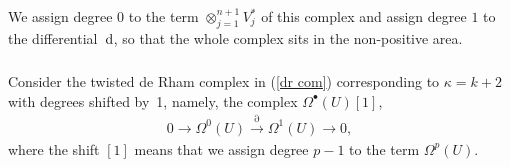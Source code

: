 We assign degree $0$ to the term $\otimes_{j=1}^{n+1}V_j^*$ of this complex and assign degree $1$ to the differential~${\rm d}$, so that the whole complex sits in the non-positive area.

\subsubsection{} Consider the twisted de Rham complex in (\ref{dr com}) corresponding to $\kappa=k+2$ with degrees shifted by~1, namely, the complex $\Omega^{\bullet}(U)[1]$,
\begin{gather*}%
 0\to\Omega^0(U) \overset{\partial}{\longrightarrow} \Omega^1(U)\to 0,
\end{gather*}
where the shift $[1]$ means that we assign degree $p-1$ to the term $\Omega^p(U)$.

